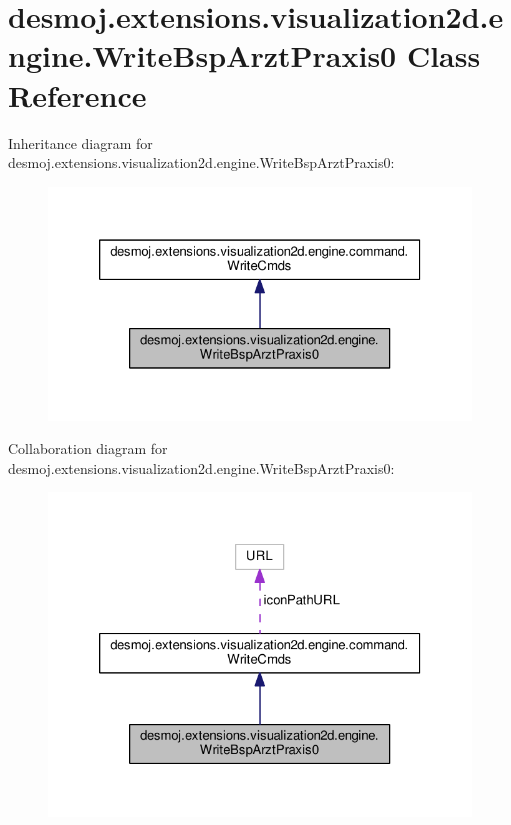 \section{desmoj.\-extensions.\-visualization2d.\-engine.\-Write\-Bsp\-Arzt\-Praxis0 Class Reference}
\label{classdesmoj_1_1extensions_1_1visualization2d_1_1engine_1_1_write_bsp_arzt_praxis0}


Inheritance diagram for desmoj.\-extensions.\-visualization2d.\-engine.\-Write\-Bsp\-Arzt\-Praxis0\-:
\nopagebreak
\begin{figure}[H]
\begin{center}
\leavevmode
\includegraphics[width=326pt]{classdesmoj_1_1extensions_1_1visualization2d_1_1engine_1_1_write_bsp_arzt_praxis0__inherit__graph}
\end{center}
\end{figure}


Collaboration diagram for desmoj.\-extensions.\-visualization2d.\-engine.\-Write\-Bsp\-Arzt\-Praxis0\-:
\nopagebreak
\begin{figure}[H]
\begin{center}
\leavevmode
\includegraphics[width=326pt]{classdesmoj_1_1extensions_1_1visualization2d_1_1engine_1_1_write_bsp_arzt_praxis0__coll__graph}
\end{center}
\end{figure}
